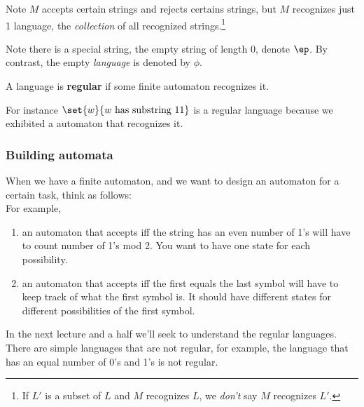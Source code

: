 Note $M$ accepts certain strings and rejects certains strings, but $M$ recognizes just 1 language, the {\it collection} of all recognized strings.\footnote{If $L'$ is a subset of $L$ and $M$ recognizes $L$, we {\it don't} say $M$ recognizes $L'$.}

Note there is a special string, the empty string of length 0, denote $\ep$. By contrast, the empty {\it language} is denoted by $\phi$.

\begin{df}
A language is \textbf{regular} if some finite automaton recognizes it. 
\end{df}
For instance $\set{w}{w\text{ has substring }11}$ is a regular language because we exhibited a automaton that recognizes it.\\

\subsubsection{Building automata}

\vskip0.15in
When we have a finite automaton, and we want to design an automaton for a certain task, think as follows: \\

\vskip0.15in
For example, 
\begin{enumerate}
\item
an automaton that accepts iff the string has an even number of 1's will have to count number of 1's mod 2. You want to have one state for each possibility.
\item 
an automaton that accepts iff the first equals the last symbol will have to keep track of what the first symbol is. It should have different states for different possibilities of the first symbol.
\end{enumerate}


In the next lecture and a half we'll seek to understand the regular languages. There are simple languages that are not regular, for example, the language that has an equal number of 0's and 1's is not regular.

